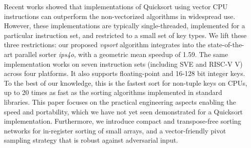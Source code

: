 Recent works showed that implementations of Quicksort using
vector CPU instructions can outperform the non-vectorized algorithms in
widespread use. However, these implementations are typically single-threaded,
implemented for a particular instruction set, and restricted to a small set of
key types. We lift these three restrictions: our proposed \emph{vqsort}
algorithm integrates into the state-of-the-art parallel sorter \emph{ips4o},
with a geometric mean speedup of 1.59. The same implementation works on seven
instruction sets (including SVE and RISC-V V) across four platforms. It also
supports floating-point and 16-128 bit integer keys. To the best of our
knowledge, this is the fastest sort for non-tuple keys on CPUs, up to 20 times
as fast as the sorting algorithms implemented in standard libraries. This paper
focuses on the practical engineering aspects enabling the speed and portability,
which we have not yet seen demonstrated for a Quicksort implementation.
Furthermore, we introduce compact and transpose-free sorting networks for
in-register sorting of small arrays, and a vector-friendly pivot sampling
strategy that is robust against adversarial input.